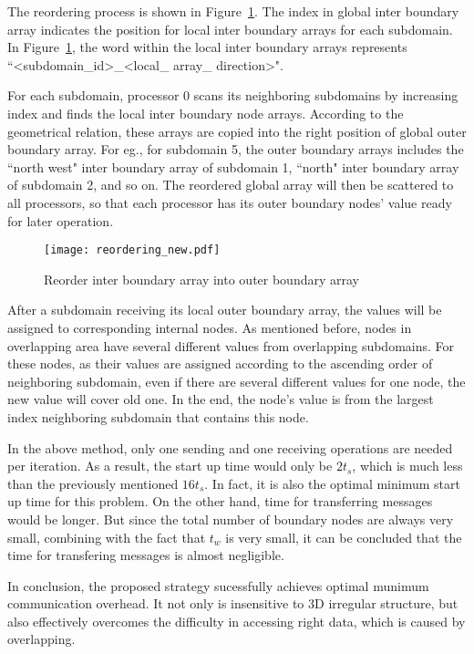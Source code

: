 \documentclass{sig-alternate}
\begin{document}
	The reordering process is shown in Figure~\ref{Fig4}. The index in global inter boundary array indicates the position for
	local inter boundary arrays for each subdomain. In Figure~\ref{Fig4}, the word within the local
	inter boundary arrays represents ``<subdomain\_id>\_<local\_ array\_ direction>".

	For each subdomain, processor 0 scans its neighboring subdomains by increasing index and finds the local inter boundary 
	node arrays. According to the geometrical relation,
	these arrays are copied into the right position of global outer boundary array. For eg., for subdomain 5, the outer boundary
	arrays includes the ``north west" inter boundary array of subdomain 1, ``north" inter boundary array of subdomain 2, 
	and so on. The reordered global array will then be scattered to all processors, so that each processor has its outer 
	boundary nodes' value ready for later operation. 
	\begin{figure}[htbp]
	  \centering
	  \texttt{[image: reordering\_new.pdf]}
	  \caption{Reorder inter boundary array into outer boundary array}
	  \label{Fig4}
	\end{figure}

	After a subdomain receiving its local outer boundary array, the values will be assigned to corresponding internal nodes. As 
	mentioned before, nodes in overlapping area have several different values from overlapping subdomains. For these nodes, 
	as their values are assigned according to the ascending order of neighboring subdomain, even if there are several different
	values for one node, the new value will cover old one. In the end, the node's value is from the largest index neighboring 
	subdomain that contains this node.  
	
	In the above method, only one sending and one receiving operations are needed per iteration. As a result, the start up time 
	would only be $2t_s$, which is much less than the previously mentioned $16t_s$. In fact, it is also the optimal 
	minimum 
	start up time for this problem. On the other hand, time for transferring messages would be longer. But since the total number 
	of boundary nodes are always very small, combining with the fact that $t_w$ is very small, it can be concluded that the 
	time for transfering messages is almost negligible. 

	In conclusion, the proposed strategy sucessfully achieves optimal munimum communication overhead. It  
	not only is insensitive to 3D irregular structure, but also effectively overcomes the difficulty in 
	accessing right data, which is caused by overlapping.	
\end{document}
